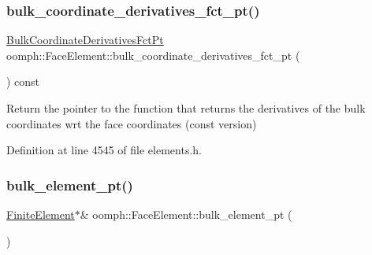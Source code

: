\mbox{\label{classoomph_1_1FaceElement_a42c2096f5c785657c3a09edce458296a}} 
\subsubsection{\texorpdfstring{bulk\+\_\+coordinate\+\_\+derivatives\+\_\+fct\+\_\+pt()}{bulk\_coordinate\_derivatives\_fct\_pt()}\hspace{0.1cm}{\footnotesize\ttfamily [2/2]}}
{\footnotesize\ttfamily \hyperlink{classoomph_1_1FaceElement_a67356b9329923767ab8f13fed85f7f88}{Bulk\+Coordinate\+Derivatives\+Fct\+Pt} oomph\+::\+Face\+Element\+::bulk\+\_\+coordinate\+\_\+derivatives\+\_\+fct\+\_\+pt (\begin{DoxyParamCaption}{ }\end{DoxyParamCaption}) const\hspace{0.3cm}{\ttfamily [inline]}}



Return the pointer to the function that returns the derivatives of the bulk coordinates wrt the face coordinates (const version) 



Definition at line 4545 of file elements.\+h.

\mbox{\label{classoomph_1_1FaceElement_a7539054d858d73989d7c1166e333e0f8}} 
\subsubsection{\texorpdfstring{bulk\+\_\+element\+\_\+pt()}{bulk\_element\_pt()}\hspace{0.1cm}{\footnotesize\ttfamily [1/2]}}
{\footnotesize\ttfamily \hyperlink{classoomph_1_1FiniteElement}{Finite\+Element}$\ast$\& oomph\+::\+Face\+Element\+::bulk\+\_\+element\+\_\+pt (\begin{DoxyParamCaption}{ }\end{DoxyParamCaption})\hspace{0.3cm}{\ttfamily [inline]}}



